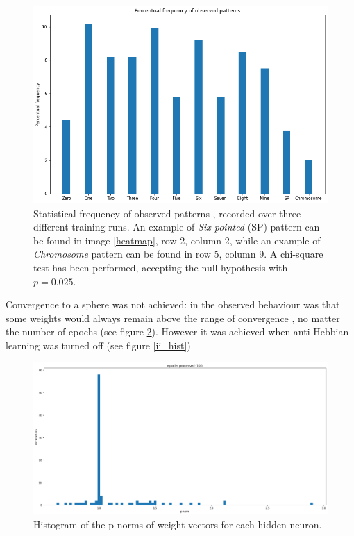 \documentclass[a4paper]{report}
\begin{document}
\begin{figure} [H]
    \centering
    \includegraphics [width=12cm ] {o/bar2.png}
    \caption{Statistical frequency of observed patterns , recorded over three different training runs. An example of \textit{Six-pointed} (SP) pattern can be found in image \ref{heatmap}, row 2, column 2, while an example of \textit{Chromosome} pattern can be found in row 5, column 9. A chi-square test has been performed, accepting the null hypothesis with $p =0.025$.}
    \label{cerchio1}
\end{figure}

 Convergence to a sphere was not achieved:
in the observed behaviour was that some weights would always remain above the range of convergence , no matter the number of epochs (see figure \ref{uu_hist}).
However it was achieved when anti Hebbian learning was turned off (see figure \ref{ii_hist})
\begin{figure} [H]
    \centering
    \includegraphics [width=12cm ] {o/uu_hist.png}
    \caption{Histogram of the p-norms of weight vectors for each hidden neuron.}
    \label{uu_hist}
\end{figure}
\end{document}
